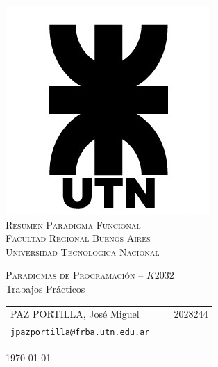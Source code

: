 \begin{titlepage}

\thispagestyle{empty}

\begin{center}
\includegraphics[scale=0.5]{./figuras/logo_utn}\\
\hfill \newline
\large{\textsc{Resumen Paradigma Funcional}}\\
\large{\textsc{Facultad Regional Buenos Aires}}\\
\large{\textsc{Universidad Tecnologica Nacional}}\\
\end{center}

\begin{center}
\LARGE{\textsc{Paradigmas de Programación -- $K2032$}}\\
\hfill \newline
\huge{Trabajos Prácticos}
\end{center}

\vspace{2cm}



\begin{center}
	\begin{tabular}{lc}
		PAZ PORTILLA, José Miguel & \ \ \ 2028244 \\
		\texttt{\href{mailto:jpazportilla@frba.utn.edu.ar}{jpazportilla@frba.utn.edu.ar}}\\
	\end{tabular}
\end{center}

\vspace{1cm}
\begin{center}
\large{\today}
\end{center}

\end{titlepage}

%
%
{
  \hypersetup{linkcolor=black}
  \tableofcontents
}
\thispagestyle{empty}
\newpage
%
%
\setcounter{page}{1}
